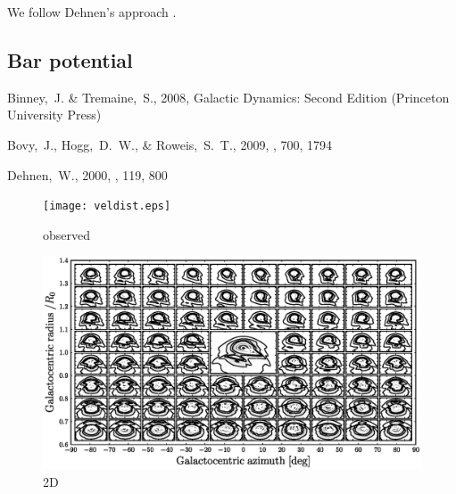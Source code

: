 \documentclass[12pt,preprint]{aastex}
\begin{document}
We follow Dehnen's approach \citep{dehnen00a}.


\subsection{Bar potential}


\begin{thebibliography}{}

{Binney},~J. \& {Tremaine},~S., 2008, {Galactic Dynamics: Second Edition}
  (Princeton University Press)

 Bovy,~J., Hogg,~D.~W., \& Roweis,~S.~T., 2009,
  \apj, 700, 1794

  Dehnen,~W., 2000, \aj, 119, 800

\end{thebibliography}


\clearpage
\begin{figure}
\texttt{[image: veldist.eps]}
\caption{observed}\label{fig:obs}
\end{figure}

\clearpage
\begin{figure}
\includegraphics[width=\textwidth]{rphi2d.ps}
\caption{2D}\label{fig:rphi2d}
\end{figure}
\end{document}
